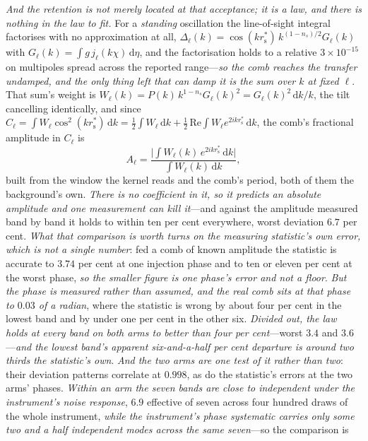 \documentclass[11pt,a4paper]{article}
\theoremstyle{plain}
\theoremstyle{definition}
\theoremstyle{remark}
\newcommand{\rs}{r_{\mathrm{s}}}
\newcommand{\dd}{\mathrm{d}}   %
\begin{document}
\emph{And the retention is not merely located at that acceptance; it is a law, and there is nothing in the law
to fit.} For a \emph{standing} oscillation the line-of-sight integral factorises with no approximation at all,
$\Delta_{\ell}(k)=\cos(k\rs^{*})\,k^{(1-n_s)/2}G_{\ell}(k)$ with $G_{\ell}(k)=\int g\,j_{\ell}(k\chi)\,\dd\eta$,
and the factorisation holds to a relative $3\times10^{-15}$ on multipoles spread across the reported
range---\emph{so the comb reaches the transfer undamped, and the only thing left that can damp it is the sum
over $k$ at fixed $\ell$}. That sum's weight is $W_{\ell}(k)=P(k)\,k^{1-n_s}G_{\ell}(k)^{2}=G_{\ell}(k)^{2}\,\dd
k/k$, the tilt cancelling identically, and since
$C_{\ell}=\int W_{\ell}\cos^{2}(k\rs^{*})\,\dd k=\tfrac12\int W_{\ell}\,\dd k+\tfrac12\,\mathrm{Re}\int
W_{\ell}e^{2ik\rs^{*}}\,\dd k$, the comb's fractional amplitude in $C_{\ell}$ is
\begin{equation}\label{eq:acceptance-law}
A_{\ell}=\frac{\bigl|\int W_{\ell}(k)\,e^{2ik\rs^{*}}\,\dd k\bigr|}{\int W_{\ell}(k)\,\dd k},
\end{equation}
built from the window the kernel reads and the comb's period, both of them the background's own. \emph{There is
no coefficient in it, so it predicts an \emph{absolute} amplitude and one measurement can kill
it}---and against the amplitude measured band by band it holds to within ten per cent everywhere, worst
deviation $6.7$ per cent. \emph{What that comparison is worth turns on the measuring statistic's own error,
which is not a single number}: fed a comb of known amplitude the statistic is accurate to $3.74$ per cent at
one injection phase and to ten or eleven per cent at the worst phase, \emph{so the smaller figure is one
phase's error and not a floor}. \emph{But the phase is measured rather than assumed, and the real comb sits at
that phase to $0.03$ of a radian}, where the statistic is wrong by about four per cent in the lowest band and
by under one per cent in the other six. \emph{Divided out, the law holds at every band on both arms to better
than four per cent}---worst $3.4$ and $3.6$---\emph{and the lowest band's apparent six-and-a-half per cent
departure is around two thirds the statistic's own}. \emph{And the two arms are one test of it rather than
two}: their deviation patterns correlate at $0.998$, as do the statistic's errors at the two arms' phases.
\emph{Within an arm the seven bands are close to independent under the instrument's noise response}, $6.9$
effective of seven across four hundred draws of the whole instrument, \emph{while the instrument's phase
systematic carries only some two and a half independent modes across the same seven}---so the comparison is
\end{document}
